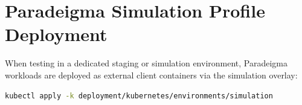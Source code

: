 \section{Paradeigma Simulation Profile Deployment}

When testing in a dedicated staging or simulation environment, Paradeigma workloads are deployed as external client containers via the simulation overlay:
\begin{lstlisting}[language=bash, caption={Deploying Paradeigma Simulation Workloads}]
kubectl apply -k deployment/kubernetes/environments/simulation
\end{lstlisting}

\newpage
